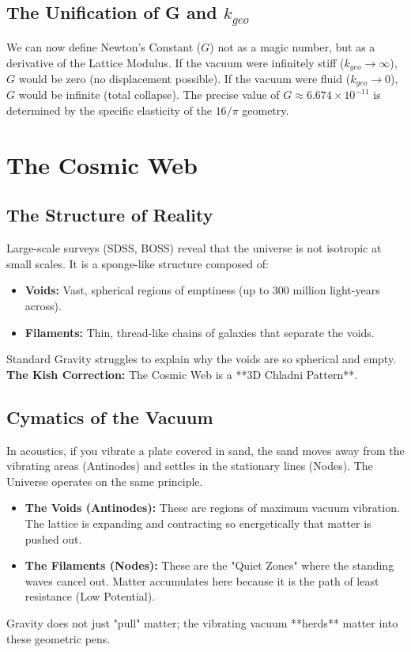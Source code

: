 \documentclass[11pt, letterpaper, openany]{book}
\begin{document}
\section{The Unification of G and $k_{geo}$}
We can now define Newton's Constant ($G$) not as a magic number, but as a derivative of the Lattice Modulus.
If the vacuum were infinitely stiff ($k_{geo} \to \infty$), $G$ would be zero (no displacement possible).
If the vacuum were fluid ($k_{geo} \to 0$), $G$ would be infinite (total collapse).
The precise value of $G \approx 6.674 \times 10^{-11}$ is determined by the specific elasticity of the $16/\pi$ geometry.


\chapter{The Cosmic Web}
\label{chap:cosmic_web}

\section{The Structure of Reality}
Large-scale surveys (SDSS, BOSS) reveal that the universe is not isotropic at small scales. It is a sponge-like structure composed of:
\begin{itemize}
    \item \textbf{Voids:} Vast, spherical regions of emptiness (up to 300 million light-years across).
    \item \textbf{Filaments:} Thin, thread-like chains of galaxies that separate the voids.
\end{itemize}
Standard Gravity struggles to explain why the voids are so spherical and empty.
\textbf{The Kish Correction:} The Cosmic Web is a **3D Chladni Pattern**.

\section{Cymatics of the Vacuum}
In acoustics, if you vibrate a plate covered in sand, the sand moves away from the vibrating areas (Antinodes) and settles in the stationary lines (Nodes).
The Universe operates on the same principle.
\begin{itemize}
    \item \textbf{The Voids (Antinodes):} These are regions of maximum vacuum vibration. The lattice is expanding and contracting so energetically that matter is pushed out.
    \item \textbf{The Filaments (Nodes):} These are the "Quiet Zones" where the standing waves cancel out. Matter accumulates here because it is the path of least resistance (Low Potential).
\end{itemize}
Gravity does not just "pull" matter; the vibrating vacuum **herds** matter into these geometric pens.
\end{document}

